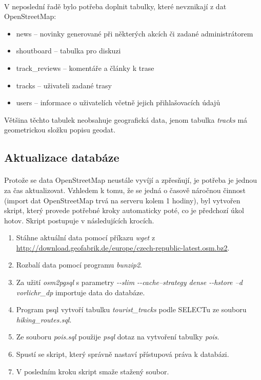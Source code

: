 \documentclass[11pt,a4paper,titlepage,oneside]{book}
\begin{document}
				\paragraph{} V neposlední řadě bylo potřeba doplnit tabulky, které nevznikají z dat OpenStreetMap:
					\begin{itemize}
						\item news -- novinky generované při některých akcích či zadané administrátorem
						\item  shoutboard -- tabulka pro diskuzi
						\item  track\_reviews -- komentáře a články k trase
						\item  tracks -- uživateli zadané trasy
						\item users -- informace o uživatelích včetně jejich přihlašovacích údajů
					\end{itemize}
Většina těchto tabulek neobsahuje geografická data, jenom tabulka \textit{tracks} má geometrickou složku popisu geodat.
			\subsection{Aktualizace databáze}
				\paragraph{} Protože se data OpenStreetMap neustále vyvíjí a zpřesňují, je potřeba je jednou za čas aktualizovat. Vzhledem k tomu, že se jedná o časově náročnou činnost (import dat OpenStreetMap trvá na serveru kolem 1 hodiny), byl vytvořen skript, který provede potřebné kroky automaticky poté, co je předchozí úkol hotov. Skript postupuje v následujících krocích.
		\begin{enumerate}
			\item Stáhne aktuální data pomocí příkazu \textit{wget}  z \url{http://download.geofabrik.de/europe/czech-republic-latest.osm.bz2}.
			\item Rozbalí data pomocí programu \textit{bunzip2}.
			\item Za užití \textit{osm2pgsql} s parametry \textit{ -\--slim  -\--cache--strategy dense -\--hstore --d vorlichr\_dp} importuje data do databáze.
			\item Program psql vytvoří tabulku \textit{tourist\_tracks} podle SELECTu ze souboru \textit{hiking\_routes.sql}.
			\item Ze souboru \textit{pois.sql} použije \textit{psql} dotaz na vytvoření tabulky \textit{pois}.
			\item Spustí se skript, který správně nastaví přístupová práva k databázi.
			\item V posledním kroku skript smaže stažený soubor.
		\end{enumerate}
\end{document}
